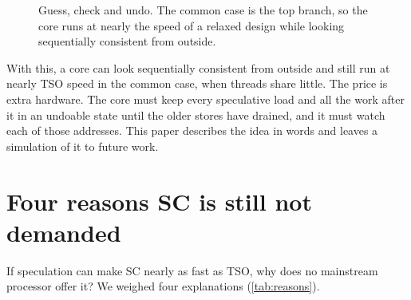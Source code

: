\begin{figure}[!htbp]
\centering
{}
\caption{Guess, check and undo. The common case is the top branch, so the core runs at nearly the speed of a relaxed design while looking sequentially consistent from outside.}
\label{fig:spec}
\end{figure}

With this, a core can look sequentially consistent from outside and still run at nearly TSO speed in the common case, when threads share little. The price is extra hardware. The core must keep every speculative load and all the work after it in an undoable state until the older stores have drained, and it must watch each of those addresses. This paper describes the idea in words and leaves a simulation of it to future work.

\section{Four reasons SC is still not demanded}
\label{sec:fourreasons}

If speculation can make SC nearly as fast as TSO, why does no mainstream processor offer it? We weighed four explanations (\cref{tab:reasons}).

